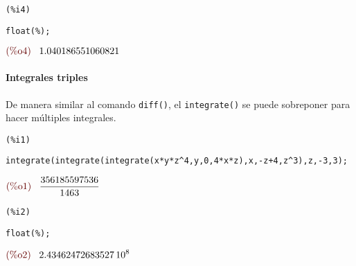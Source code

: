 \documentclass[12pt]{article}
\begin{document}
\noindent
\begin{minipage}[t]{8ex}{\color{red}\bf
\begin{verbatim}
(%i4) 
\end{verbatim}}
\end{minipage}
\begin{minipage}[t]{\textwidth}{\color{blue}
\begin{verbatim}
float(%);
\end{verbatim}}
\end{minipage}
\begin{math}\displaystyle
\parbox{8ex}{\color{labelcolor}(\%o4) }
1.040186551060821
\end{math}

\paragraph{Integrales triples} De manera similar al comando \texttt{diff()}, el \texttt{integrate()} se puede sobreponer para hacer múltiples integrales.

\noindent
\begin{minipage}[t]{8ex}{\color{red}\bf
\begin{verbatim}
(%i1) 
\end{verbatim}}
\end{minipage}
\begin{minipage}[t]{\textwidth}{\color{blue}
\begin{verbatim}
integrate(integrate(integrate(x*y*z^4,y,0,4*x*z),x,-z+4,z^3),z,-3,3);
\end{verbatim}}
\end{minipage}
\begin{math}\displaystyle
\parbox{8ex}{\color{labelcolor}(\%o1) }
\frac{356185597536}{1463}
\end{math}


\noindent
\begin{minipage}[t]{8ex}{\color{red}\bf
\begin{verbatim}
(%i2) 
\end{verbatim}}
\end{minipage}
\begin{minipage}[t]{\textwidth}{\color{blue}
\begin{verbatim}
float(%);
\end{verbatim}}
\end{minipage}
\begin{math}\displaystyle
\parbox{8ex}{\color{labelcolor}(\%o2) }
2.43462472683527\,{10}^{8}
\end{math}
\end{document}
